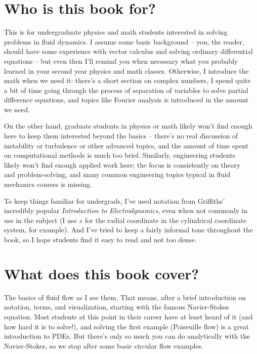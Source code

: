 \documentclass[10pt, a5paper, twoside, openany]{memoir}
\newcounter{example}[chapter]
\newcounter{problem}[chapter]
\begin{document}
\section{Who is this book for?}

This is for undergraduate physics and math students interested in solving problems in fluid dynamics.  I assume some basic background -- you, the reader, should have some experience with vector calculus and solving ordinary differential equations -- but even then I'll remind you when necessary what you probably learned in your second year physics and math classes.  Otherwise, I introduce the math when we need it: there's a short section on complex numbers, I spend quite a bit of time going through the process of separation of variables to solve partial difference equations, and topics like Fourier analysis is introduced in the amount we need.

On the other hand, graduate students in physics or math likely won't find enough here to keep them interested beyond the basics -- there's no real discussion of instability or turbulence or other advanced topics, and the amount of time spent on computational methods is much too brief.  Similarly, engineering students likely won't find enough applied work here; the focus is consistently on theory and problem-solving, and many common engineering topics typical in fluid mechanics courses is missing.

To keep things familiar for undergrads, I've used notation from Griffiths' incredibly popular \emph{Introduction to Electrodynamics}, even when not commonly in use in the subject (I use $s$ for the radial coordinate in the cylindrical coordinate system, for example). And I've tried to keep a fairly informal tone throughout the book, so I hope students find it easy to read and not too dense.

\section{What does this book cover?}

The basics of fluid flow as I see them.  That means, after a brief introduction on notation, terms, and visualization, starting with the famous Navier-Stokes equation.  Most students at this point in their career have at least heard of it (and how hard it is to solve!), and solving the first example (Poiseuille flow) is a great introduction to PDEs.  But there's only so much you can do analytically with the Navier-Stokes, so we stop after some basic circular flow examples.  
\end{document}
